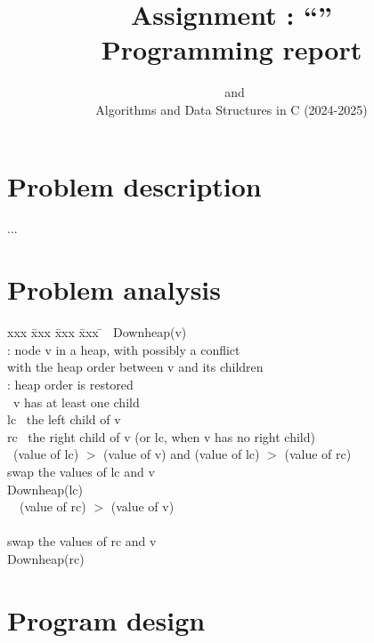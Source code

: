 \documentclass{adsrprt}
\title{Assignment \assgnnum: ``\assgntitle''\\Programming report}
\subtitle{\snumA\ and \snumB\\Algorithms and Data Structures in C (2024-2025)}
\begin{document}
\maketitle


\section{Problem description}

...

\section{Problem analysis}


\begin{tabbing}
xxx \= xxx \= xxx \= xxx \= \kill
\Algorithm~Downheap(v) \\
\> \Input: node v in a heap, with possibly a conflict \\
\> \> with the heap order between v and its children \\
\> \Result: heap order is restored \\
\> \If~v has at least one child \Then \\
\> \> lc \becomes~the left child of v \\
\> \> rc \becomes~the right child of v (or lc, when v has no right child) \\
\> \> \If~(value of lc) \(>\) (value of v) and (value of lc) $>$ (value of rc) \Then \\
\> \> \> swap the values of lc and v \\
\> \> \> Downheap(lc) \\
\> \> \Else~\If~(value of rc) \(>\) (value of v) \Then \\
\> \> \>  \\
\> \> \> swap the values of rc and v \\
\> \> \> Downheap(rc)
\end{tabbing}

\section{Program design}
\end{document}
